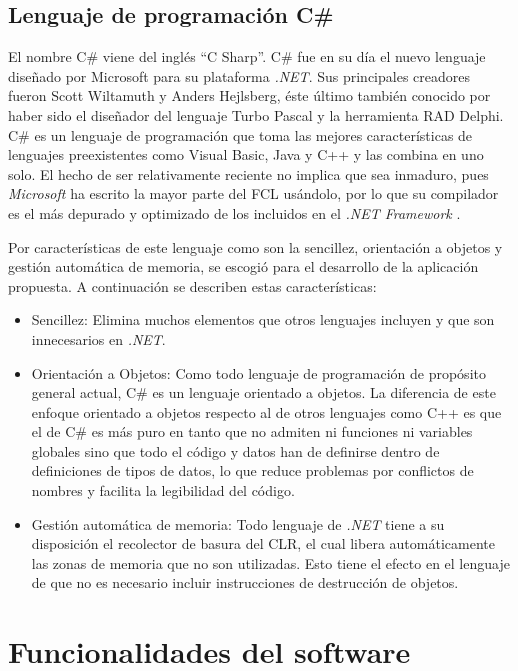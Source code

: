 \subsection{Lenguaje de programación C\#}

El nombre C\# viene del inglés “C Sharp”. C\# fue en su día el nuevo lenguaje diseñado por Microsoft para su plataforma \textit{.NET}. Sus principales creadores fueron Scott Wiltamuth y Anders Hejlsberg, éste último también conocido por haber sido el diseñador del lenguaje Turbo Pascal y la herramienta RAD Delphi.
C\# es un lenguaje de programación que toma las mejores características de lenguajes preexistentes como Visual Basic, Java y C++ y las combina en uno solo. El hecho de ser relativamente reciente no implica que sea inmaduro, pues \textit{Microsoft} ha escrito la mayor parte del FCL usándolo, por lo que su compilador es el más depurado y optimizado de los incluidos en el \textit{.NET Framework} \cite{DK0, DK9}.

Por características de este lenguaje como son la sencillez, orientación a objetos y gestión automática de memoria, se escogió para el desarrollo de la aplicación propuesta. A continuación se describen estas características: 

\begin{itemize}
\item Sencillez: Elimina muchos elementos que otros lenguajes incluyen y que son innecesarios en \textit{.NET}.

\item Orientación a Objetos: Como todo lenguaje de programación de propósito general actual, C\# es un lenguaje orientado a objetos. La diferencia de este enfoque orientado a objetos respecto al de otros lenguajes como C++ es que el de C\# es más puro en tanto que no admiten ni funciones ni variables globales sino que todo el código y datos han de definirse dentro de definiciones de tipos de datos, lo que reduce problemas por conflictos de nombres y facilita la legibilidad del código.

\item Gestión automática de memoria: Todo lenguaje de \textit{.NET} tiene a su disposición el recolector de basura del CLR, el cual libera automáticamente las zonas de memoria que no son utilizadas. Esto tiene el efecto en el lenguaje de que no es necesario incluir instrucciones de destrucción de objetos.
\end{itemize}

\section{Funcionalidades del software}

